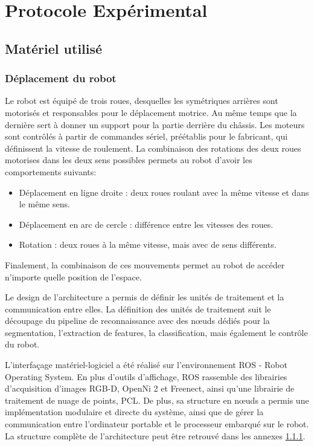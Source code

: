 \chapter {Protocole Expérimental}

\section{Matériel utilisé}

\subsection{Déplacement du robot}

Le robot est équipé de trois roues, desquelles les symétriques
arrières sont motorisés et responsables pour le déplacement
motrice. Au même temps que la dernière sert à donner un support pour
la partie derrière du châssis. Les moteurs sont contrôlés à
partir de commandes sériel, préétablis pour le fabricant, qui
définissent la vitesse de roulement. La combinaison des rotations
des deux roues motorises dans les deux sens possibles permets au
robot d'avoir les comportements suivants:

\begin {itemize}
\item Déplacement en ligne droite : deux roues roulant avec la même vitesse et dans le même sens.

\item Déplacement en arc de cercle : différence entre les vitesses des roues.

\item Rotation : deux roues à la même vitesse, mais avec de sens différents.
\end{itemize}

Finalement, la combinaison de ces mouvements permet au robot de
accéder n'importe quelle position de l’espace.


Le design de l'architecture a permis de définir les unités de traitement et la communication entre elles. La définition des unités de traitement suit le découpage du pipeline de reconnaissance avec des nœuds dédiés pour la segmentation, l'extraction de features, la classification, mais également le contrôle du robot.

L'interfaçage matériel-logiciel a été réalisé sur l'environnement ROS - Robot Operating System. En plus d'outils d'affichage, ROS rassemble des librairies d'acquisition d'images RGB-D, OpenNi 2 et Freenect, ainsi qu'une librairie de traitement de nuage de points, PCL.
De plus, sa structure en nœuds a permis une implémentation modulaire et directe du système, ainsi que de gérer la communication entre l'ordinateur portable et le processeur embarqué sur le robot. La structure complète de l'architecture peut être retrouvé dans les annexes \ref{}.

